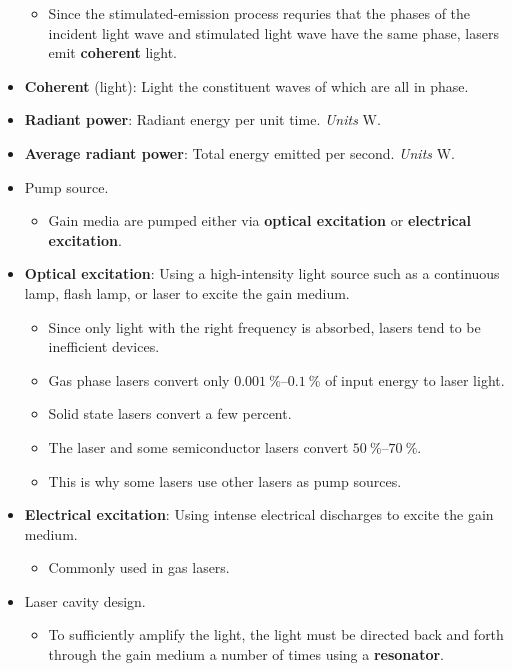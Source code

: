 \documentclass[../notes.tex]{subfiles}
\begin{document}
\begin{itemize}
\begin{itemize}
        \item Since the stimulated-emission process requries that the phases of the incident light wave and stimulated light wave have the same phase, lasers emit \textbf{coherent} light.
    \end{itemize}
    \item \textbf{Coherent} (light): Light the constituent waves of which are all in phase.
    \item \textbf{Radiant power}: Radiant energy per unit time. \emph{Units} $\si{\watt}$.
    \item \textbf{Average radiant power}: Total energy emitted per second. \emph{Units} $\si{\watt}$.
    \item Pump source.
    \begin{itemize}
        \item Gain media are pumped either via \textbf{optical excitation} or \textbf{electrical excitation}.
    \end{itemize}
    \item \textbf{Optical excitation}: Using a high-intensity light source such as a continuous lamp, flash lamp, or laser to excite the gain medium.
    \begin{itemize}
        \item Since only light with the right frequency is absorbed, lasers tend to be inefficient devices.
        \item Gas phase lasers convert only $\SIrange{0.001}{0.1}{\percent}$ of input energy to laser light.
        \item Solid state lasers convert a few percent.
        \item The  laser and some semiconductor lasers convert $\SIrange{50}{70}{\percent}$.
        \item This is why some lasers use other lasers as pump sources.
    \end{itemize}
    \item \textbf{Electrical excitation}: Using intense electrical discharges to excite the gain medium.
    \begin{itemize}
        \item Commonly used in gas lasers.
    \end{itemize}
    \item Laser cavity design.
    \begin{itemize}
        \item To sufficiently amplify the light, the light must be directed back and forth through the gain medium a number of times using a \textbf{resonator}.

\end{itemize}
\end{itemize}
\end{document}
